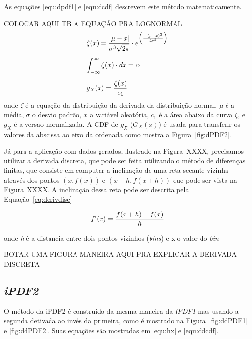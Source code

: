 As equações \eqref{equ:dpdf1} e \eqref{equ:dcdf} descrevem este método matematicamente.

\color{red} COLOCAR AQUI TB A EQUAÇÃO PRA LOGNORMAL \color{black}
\begin{equation}
\begin{array}{l}
\vspace{0.3cm}\displaystyle \zeta(x) = \frac{|\mu-x|}{\sigma^3\sqrt{2\pi}}\cdot e^{\left(\frac{-(\mu-x)^2}{2\sigma^2}\right) } \\
\vspace{0.3cm} \displaystyle \int_{-\infty}^{\infty} \zeta(x)\cdot dx = c_1 \\
\displaystyle g_X(x) = \frac{\zeta(x)}{c_1}
\label{equ:dpdf1}
\end{array}
\end{equation}
onde $\zeta$ é a equação da distribuição da derivada da distribuição normal, $\mu$ é a média, $\sigma$ o desvio padrão, $x$ a variável aleatória, $c_1$ é a área abaixo da curva $\zeta$, e $g_X$ é a versão normalizada.	
A \ac{CDF} de $g_X$ ($G_X(x)$) é usada para transferir os valores da abscissa ao eixo da ordenada como mostra a  Figura~\ref{fig:dPDF2}.




Já para a aplicação com dados gerados, ilustrado na Figura~XXXX, precisamos utilizar a derivada discreta, que pode ser feita utilizando o método de diferenças finitas, que consiste em computar a inclinação de uma reta secante vizinha através dos pontos $(x,f(x))$ e $(x+h,f(x+h))$ \cite{burden2001numerical} que pode ser vista na Figura~XXXX. A inclinação dessa reta pode ser descrita pela Equação~\eqref{eq:derivdisc}

\begin{equation}
{\displaystyle f'(x) = {f(x+h)-f(x) \over h}}
\label{eq:derivdisc}
\end{equation}

onde \textit{h} é a distancia entre dois pontos vizinhos (\textit{bins}) e x o valor do \textit{bin}

{\color{red} BOTAR UMA FIGURA MANEIRA AQUI PRA EXPLICAR A DERIVADA DISCRETA}




\subsection{\textit{iPDF2}} \label{cap:ipdf2}
O método da \ac{iPDF2} é construído da mesma maneira da \textit{IPDF1} mas usando a segunda detivada ao invés da primeira, como é mostrado na Figura~\ref{fig:ddPDF1} e \ref{fig:ddPDF2}. Suas equações são mostradas em \eqref{equ:hx} e \eqref{equ:ddcdf}.

